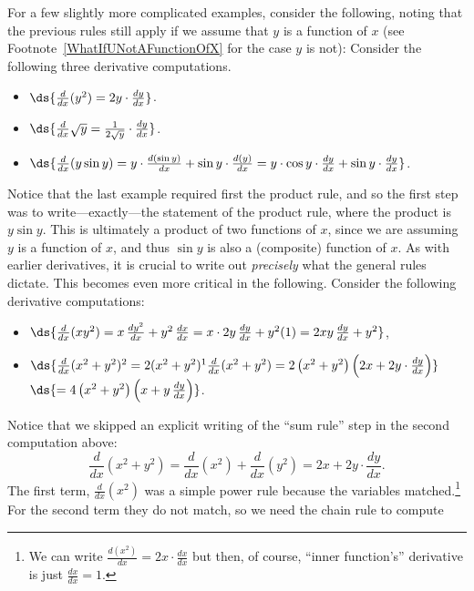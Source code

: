 For a few slightly  more complicated examples,
consider the following, noting that the previous
rules still apply if we assume that $y$ is a function of $x$
(see  Footnote~\ref{WhatIfUNotAFunctionOfX} 
for the case $y$ is not):
\bex Consider the following three derivative computations.
\begin{itemize}
\item $\ds{\frac{d}{dx}(y^2)=2y\cdot\frac{dy}{dx}}$.
\item $\ds{\frac{d}{dx}\sqrt{y}=\frac1{2\sqrt{y}}\cdot\frac{dy}{dx}}$.
\item $\ds{\frac{d}{dx}(y\sin y)=y\cdot\frac{d(\sin y)}{dx}+\sin y\cdot
                       \frac{d(y)}{dx}=y\cdot\cos y\cdot\frac{dy}{dx}
                       +\sin y\cdot\frac{dy}{dx}}$.
\end{itemize}
\eex
Notice that the last example required first the product rule,
and so the first step was to  write---exactly---the statement
of the product rule, where the product is $y\sin y$.  
This is ultimately a product of two functions of $x$, since
we are assuming $y$ is a function of $x$, and thus $\sin y$
is also a (composite) function of $x$.
As with earlier derivatives, it is crucial to write out
{\it precisely} what the general rules dictate.  This becomes
even more critical in the following.
\bex Consider the following derivative computations:
\begin{itemize}
\item $\ds{\frac{d}{dx}(xy^2)=x\,\frac{dy^2}{dx}+y^2\,\frac{dx}{dx}
                   =x\cdot2y\,\frac{dy}{dx}+y^2(1)=2xy\,\frac{dy}{dx}+y^2}$,
\item $\ds{\frac{d}{dx}(x^2+y^2)^2=2(x^2+y^2)^1\frac{d}{dx}(x^2+y^2)
          =2\left(x^2+y^2\right)\left(2x+2y\cdot\frac{dy}{dx}\right)}$\newline
         $\ds{=4\left(x^2+y^2\right)\left(x+y\,\frac{dy}{dx}\right)}$.
\end{itemize}
\eex
Notice that we skipped an explicit writing of
the  ``sum rule'' step in the second computation above:
$$\frac{d}{dx}\left(x^2+y^2\right)
  =\frac{d}{dx}\left(x^2\right)+\frac{d}{dx}\left(y^2\right)
  =2x+2y\cdot\frac{dy}{dx}.$$
The first term, $\frac{d}{dx}(x^2)$ was a simple power rule 
because the variables matched.\footnote{%
We can write ${\frac{d\left(x^2\right)}{dx}
=2x\cdot\frac{dx}{dx}}$ but then, of course, 
``inner function's'' derivative is just ${\frac{dx}{dx}}=1$.
}  For the second term they
do not match, so we need the chain rule to compute
